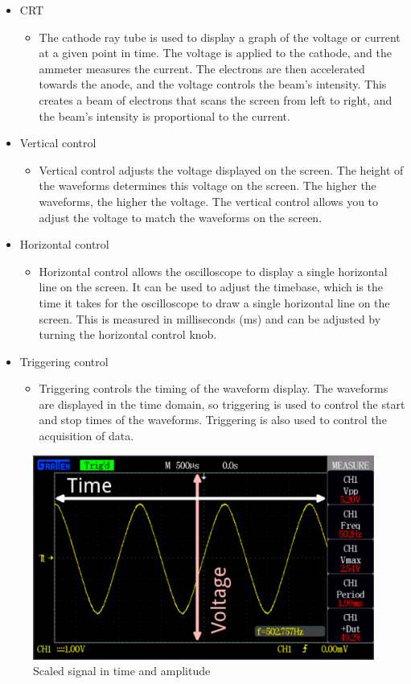 \begin{itemize}
	\item CRT
	\begin{itemize}
		\item The cathode ray tube is used to display a graph of the voltage or current at a given point in time. The voltage is applied to the cathode, and the ammeter measures the current. The electrons are then accelerated towards the anode, and the voltage controls the beam’s intensity. This creates a beam of electrons that scans the screen from left to right, and the beam’s intensity is proportional to the current.
	\end{itemize}
	\item Vertical control
	\begin{itemize}
		\item Vertical control adjusts the voltage displayed on the screen. The height of the waveforms determines this voltage on the screen. The higher the waveforms, the higher the voltage. The vertical control allows you to adjust the voltage to match the waveforms on the screen.
	\end{itemize}
	\item Horizontal control
	\begin{itemize}
		\item Horizontal control allows the oscilloscope to display a single horizontal line on the screen. It can be used to adjust the timebase, which is the time it takes for the oscilloscope to draw a single horizontal line on the screen. This is measured in milliseconds (ms) and can be adjusted by turning the horizontal control knob.
	\end{itemize}
	\item Triggering control
	\begin{itemize}
		\item Triggering controls the timing of the waveform display. The waveforms are displayed in the time domain, so triggering is used to control the start and stop times of the waveforms. Triggering is also used to control the acquisition of data.
	\end{itemize}
\end{itemize}

\begin{figure}[H]
	\centering
	\includegraphics[width=12cm]{images/img.png}
	\caption{Scaled signal in time and amplitude}
	\label{fig:dunno}
\end{figure}


